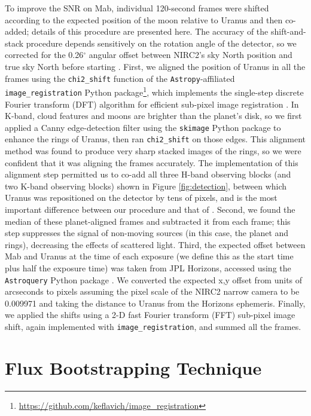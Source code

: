 \documentclass[preprint]{aastex631}
\begin{document}
To improve the SNR on Mab, individual 120-second frames were shifted according to the expected position of the moon relative to Uranus and then co-added; details of this procedure are presented here. The accuracy of the shift-and-stack procedure depends sensitively on the rotation angle of the detector, so we corrected for the 0.26$^\circ$ angular offset between NIRC2's sky North position and true sky North before starting \citep{service16}. First, we aligned the position of Uranus in all the frames using the \texttt{chi2\_shift} function of the \texttt{Astropy}-affiliated \texttt{image\_registration} Python package\footnote{\url{https://github.com/keflavich/image_registration}}, which implements the single-step discrete Fourier transform (DFT) algorithm for efficient sub-pixel image registration \citep{guizarsicairos08}. In K-band, cloud features and moons are brighter than the planet's disk, so we first applied a Canny edge-detection filter using the \texttt{skimage} Python package \citep{skimage14} to enhance the rings of Uranus, then ran \texttt{chi2\_shift} on those edges. This alignment method was found to produce very sharp stacked images of the rings, so we were confident that it was aligning the frames accurately. The implementation of this alignment step permitted us to co-add all three H-band observing blocks (and two K-band observing blocks) shown in Figure \ref{fig:detection}, between which Uranus was repositioned on the detector by tens of pixels, and is the most important difference between our procedure and that of \citet{paradis19, paradis23}.  Second, we found the median of these planet-aligned frames and subtracted it from each frame; this step suppresses the signal of non-moving sources (in this case, the planet and rings), decreasing the effects of scattered light. Third, the expected offset between Mab and Uranus at the time of each exposure (we define this as the start time plus half the exposure time) was taken from JPL Horizons, accessed using the \texttt{Astroquery} Python package \citep{ginsburg19}. We converted the expected x,y offset from units of arcseconds to pixels assuming the pixel scale of the NIRC2 narrow camera to be 0.009971\arcsec \citep{service16} and taking the distance to Uranus from the Horizons ephemeris. Finally, we applied the shifts using a 2-D fast Fourier transform (FFT) sub-pixel image shift, again implemented with \texttt{image\_registration}, and summed all the frames.


\section{Flux Bootstrapping Technique}
\label{s:bootstrapping}
\end{document}
